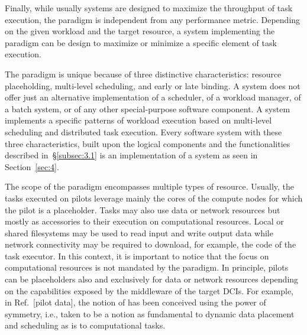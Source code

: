 \documentclass{sig-alternate}
\begin{document}
Finally, while usually \pilot systems are designed to maximize the
throughput of task execution, the \pilot paradigm is independent from
any performance metric. Depending on the given workload and the target
resource, a \pilot system implementing the \pilot paradigm can be design
to maximize or minimize a specific element of task execution.

The \pilot paradigm is unique because of three distinctive
characteristics: resource placeholding, multi-level scheduling, and
early or late binding. A \pilot system does not offer just an
alternative implementation of a scheduler, of a workload manager, of a
batch system, or of any other special-purpose software component. A
\pilot system implements a specific patterns of workload execution based
on multi-level scheduling and distributed task execution. Every software
system with these three characteristics, built upon the logical
components and the functionalities described in~\S\ref{subsec:3.1} is an
implementation of a \pilot system as seen in Section~\ref{sec:4}.




The scope of the \pilot paradigm encompasses multiple types of resource.
Usually, the tasks executed on pilots leverage mainly the cores of the
compute nodes for which the pilot is a placeholder. Tasks may also use
data or network resources but mostly as accessories to their execution
on computational resources. Local or shared filesystems may be used to
read input and write output data while network connectivity may be
required to download, for example, the code of the task executor. In
this context, it is important to notice that the focus on computational
resources is not mandated by the \pilot paradigm. In principle, pilots
can be placeholders also and exclusively for data or network resources
depending on the capabilities exposed by the middleware of the target
DCIs. For example, in Ref.~[pilot data], the notion of \pilotdata has
been conceived using the power of symmetry, i.e., \pilotdata taken to be
a notion as fundamental to dynamic data placement and scheduling as
\pilot is to computational tasks.
\end{document}
